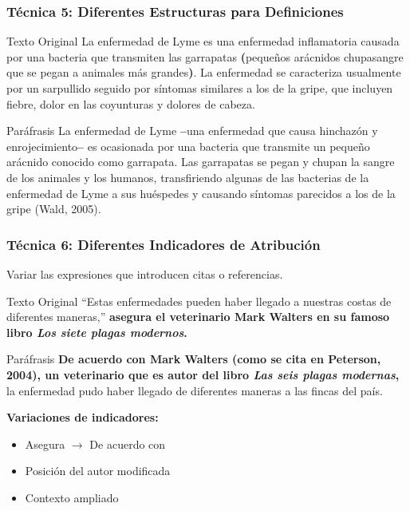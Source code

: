 \documentclass[aspectratio=169]{beamer}
\begin{document}
\begin{frame}
	\frametitle{Técnica 5: Diferentes Estructuras para Definiciones}
	
	\begin{exampleblock}{Texto Original}
		\small
		La enfermedad de Lyme es una enfermedad inflamatoria causada por una bacteria que transmiten las garrapatas \textbf{(}pequeños arácnidos chupasangre que se pegan a animales más grandes\textbf{)}. La enfermedad se caracteriza usualmente por un sarpullido seguido por síntomas similares a los de la gripe, que incluyen fiebre, dolor en las coyunturas y dolores de cabeza.
	\end{exampleblock}
	
	\vspace{0.5em}
	
	\begin{exampleblock}{Paráfrasis}
		\small
		La enfermedad de Lyme \textbf{--}una enfermedad que causa hinchazón y enrojecimiento\textbf{--} es ocasionada por una bacteria que transmite un pequeño arácnido conocido como garrapata. Las garrapatas se pegan y chupan la sangre de los animales y los humanos, transfiriendo algunas de las bacterias de la enfermedad de Lyme a sus huéspedes y causando síntomas parecidos a los de la gripe (Wald, 2005).
	\end{exampleblock}
\end{frame}

\begin{frame}
	\frametitle{Técnica 6: Diferentes Indicadores de Atribución}
	
	Variar las expresiones que introducen citas o referencias.
	
	\vspace{0.5em}
	
	\begin{exampleblock}{Texto Original}
		\small
		``Estas enfermedades pueden haber llegado a nuestras costas de diferentes maneras,'' \textbf{asegura el veterinario Mark Walters en su famoso libro \textit{Los siete plagas modernos}.}
	\end{exampleblock}
	
	\vspace{0.5em}
	
	\begin{exampleblock}{Paráfrasis}
		\small
		\textbf{De acuerdo con Mark Walters (como se cita en Peterson, 2004), un veterinario que es autor del libro \textit{Las seis plagas modernas},} la enfermedad pudo haber llegado de diferentes maneras a las fincas del país.
	\end{exampleblock}
	
	\vspace{0.5em}
	
	\textbf{Variaciones de indicadores:}
	\begin{itemize}
		\item Asegura $\rightarrow$ De acuerdo con
		\item Posición del autor modificada
		\item Contexto ampliado
	\end{itemize}
\end{frame}
\end{document}
